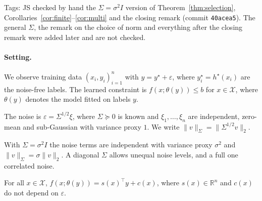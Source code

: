 %
%

\begin{outline}
Tags: JS checked by hand the $\Sigma = \sigma^2 I$ version of
Theorem~\ref{thm:selection}, Corollaries~\ref{cor:finite}--\ref{cor:multi}
and the closing remark (commit \texttt{40acea5}). The general $\Sigma$, the
remark on the choice of norm and everything after the closing remark were
added later and are not checked.
\end{outline}

\paragraph{Setting.}
We observe training data $(x_i, y_i)_{i=1}^n$ with $y = y^\star + \varepsilon$,
where $y^\star_i = h^\star(x_i)$ are the noise-free labels. The learned
constraint is $f(x;\theta(y)) \le b$ for $x \in \mathcal{X}$, where $\theta(y)$
denotes the model fitted on labels $y$.

\begin{assumption}\label{ass:noise}
The noise is $\varepsilon = \Sigma^{1/2}\xi$, where $\Sigma \succeq 0$ is known
and $\xi_1,\dots,\xi_n$ are independent, zero-mean and sub-Gaussian with
variance proxy $1$. We write $\|v\|_\Sigma = \|\Sigma^{1/2}v\|_2$.
\end{assumption}

With $\Sigma = \sigma^2 I$ the noise terms are independent with variance proxy
$\sigma^2$ and $\|v\|_\Sigma = \sigma\|v\|_2$. A diagonal $\Sigma$ allows
unequal noise levels, and a full one correlated noise.

\begin{assumption}\label{ass:affine}
For all $x \in \mathcal{X}$, $f(x;\theta(y)) = s(x)^\top y + c(x)$, where
$s(x) \in \mathbb{R}^n$ and $c(x)$ do not depend on $\varepsilon$.
\end{assumption}

